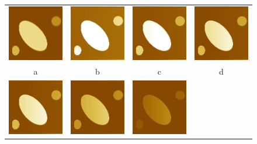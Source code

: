\documentclass{procDDs}
\begin{document}
\begin{figure}[h!]\center%
	\label{ris:desc2}
	\begin{tabular}{cccc}
		\includegraphics[width=0.2\linewidth]{img/6/1.jpg}&
		\includegraphics[width=0.2\linewidth]{img/6/3.jpg}&
		\includegraphics[width=0.2\linewidth]{img/6/4.jpg}&
		\includegraphics[width=0.2\linewidth]{img/6/5.jpg}\\
		a & b & c & d \\
		\includegraphics[width=0.2\linewidth]{img/6/5.jpg}&
		\includegraphics[width=0.2\linewidth]{img/6/6.jpg}&
		\includegraphics[width=0.2\linewidth]{img/6/9.jpg}&

\end{tabular}
\end{figure}
\end{document}
